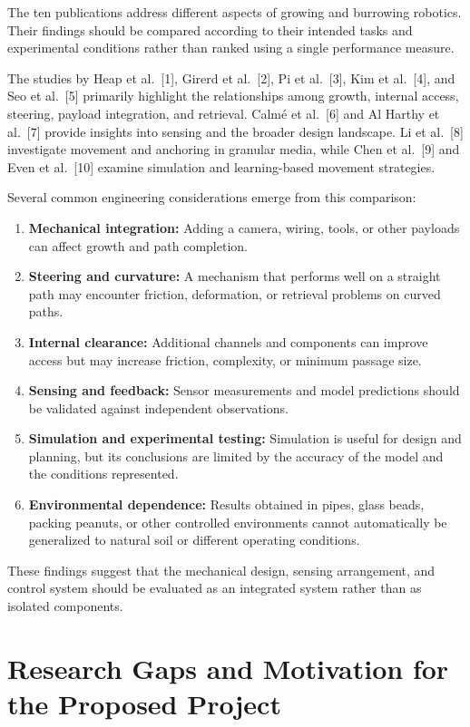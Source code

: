 The ten publications address different aspects of growing and burrowing robotics. Their findings should be compared according to their intended tasks and experimental conditions rather than ranked using a single performance measure.

The studies by Heap et al.~[1], Girerd et al.~[2], Pi et al.~[3], Kim et al.~[4], and Seo et al.~[5] primarily highlight the relationships among growth, internal access, steering, payload integration, and retrieval. Calm\'e et al.~[6] and Al Harthy et al.~[7] provide insights into sensing and the broader design landscape. Li et al.~[8] investigate movement and anchoring in granular media, while Chen et al.~[9] and Even et al.~[10] examine simulation and learning-based movement strategies.

Several common engineering considerations emerge from this comparison:

\begin{enumerate}
    \item \textbf{Mechanical integration:} Adding a camera, wiring, tools, or other payloads can affect growth and path completion.
    \item \textbf{Steering and curvature:} A mechanism that performs well on a straight path may encounter friction, deformation, or retrieval problems on curved paths.
    \item \textbf{Internal clearance:} Additional channels and components can improve access but may increase friction, complexity, or minimum passage size.
    \item \textbf{Sensing and feedback:} Sensor measurements and model predictions should be validated against independent observations.
    \item \textbf{Simulation and experimental testing:} Simulation is useful for design and planning, but its conclusions are limited by the accuracy of the model and the conditions represented.
    \item \textbf{Environmental dependence:} Results obtained in pipes, glass beads, packing peanuts, or other controlled environments cannot automatically be generalized to natural soil or different operating conditions.
\end{enumerate}

These findings suggest that the mechanical design, sensing arrangement, and control system should be evaluated as an integrated system rather than as isolated components.

\section{Research Gaps and Motivation for the Proposed Project}

